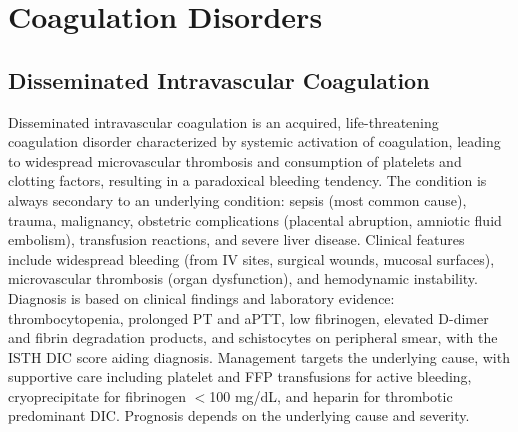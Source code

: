 \section{Coagulation Disorders}








\label{sec:Coagulation Disorders}

\subsection{Disseminated Intravascular Coagulation}
\label{sec:Disseminated Intravascular Coagulation}
Disseminated intravascular coagulation is an acquired, life-threatening coagulation disorder characterized by systemic activation of coagulation, leading to widespread microvascular thrombosis and consumption of platelets and clotting factors, resulting in a paradoxical bleeding tendency. The condition is always secondary to an underlying condition: sepsis (most common cause), trauma, malignancy, obstetric complications (placental abruption, amniotic fluid embolism), transfusion reactions, and severe liver disease. Clinical features include widespread bleeding (from IV sites, surgical wounds, mucosal surfaces), microvascular thrombosis (organ dysfunction), and hemodynamic instability. Diagnosis is based on clinical findings and laboratory evidence: thrombocytopenia, prolonged PT and aPTT, low fibrinogen, elevated D-dimer and fibrin degradation products, and schistocytes on peripheral smear, with the ISTH DIC score aiding diagnosis. Management targets the underlying cause, with supportive care including platelet and FFP transfusions for active bleeding, cryoprecipitate for fibrinogen $<$100 mg/dL, and heparin for thrombotic predominant DIC. Prognosis depends on the underlying cause and severity.

